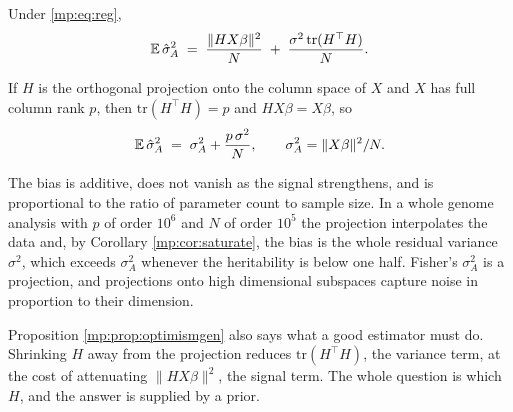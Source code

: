 \begin{proposition}
\label{mp:prop:optimismgen}
Under \eqref{mp:eq:reg},
\[
\mathbb{E}\,\hat\sigma_A^2 \;=\; \frac{\|HX\beta\|^2}{N} \;+\;
\frac{\sigma^2\,\mathrm{tr}(H^\top H)}{N}.
\]
\end{proposition}

\begin{corollary}
\label{mp:prop:optimism}
If $H$ is the orthogonal projection onto the column space of $X$ and $X$ has full column
rank $p$, then $\mathrm{tr}(H^\top H)=p$ and $HX\beta=X\beta$, so
\[
\mathbb{E}\,\hat\sigma_A^2 \;=\; \sigma_A^2 + \frac{p\,\sigma^2}{N},
\qquad \sigma_A^2=\|X\beta\|^2/N .
\]
\end{corollary}

The bias is additive, does not vanish as the signal strengthens, and is proportional to the
ratio of parameter count to sample size. In a whole genome analysis with $p$ of order
$10^6$ and $N$ of order $10^5$ the projection interpolates the data and, by Corollary \ref{mp:cor:saturate}, the bias is the whole residual variance $\sigma^2$, which exceeds $\sigma_A^2$ whenever the heritability is below one half. Fisher's
$\sigma_A^2$ is a projection, and projections onto high dimensional subspaces capture noise
in proportion to their dimension.

Proposition \ref{mp:prop:optimismgen} also says what a good estimator must do. Shrinking $H$
away from the projection reduces $\mathrm{tr}(H^\top H)$, the variance term, at the cost of
attenuating $\|HX\beta\|^2$, the signal term. The whole question is which $H$, and the
answer is supplied by a prior.

